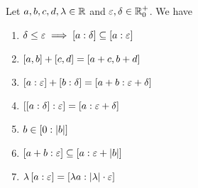\begin{theorem}
  Let $a,b,c,d,\lambda\in\R$ and $\epsilon,\delta\in\Rplusnull$. We have

  \begin{enumerate}
    \item $\delta \le \epsilon \implies \an[\delta]{a} \subseteq \an[\epsilon]{a}$
    \item $\interval ab + \interval cd = \interval{a+c}{b+d}$
    \item $\an[\epsilon]{a}+\an[\delta]{b}=\an[\epsilon+\delta]{a+b}$
    \item $\an[\epsilon]{\an[\delta]{a}} = \an[\epsilon+\delta]{a}$
    \item $b \in \an[|b|]{0}$
    \item $\an[\epsilon]{a+b} \subseteq \an[\epsilon+\abs{b}]{a}$
    \item $\lambda \an[\epsilon]{a} = \an[\abs{\lambda}\cdot \epsilon]{\lambda a}$
  \end{enumerate}
\end{theorem}
